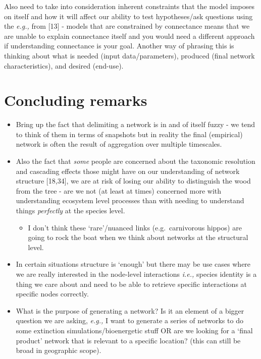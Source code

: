 \documentclass[
]{article}
\providecommand{\tightlist}{%
  \setlength{\itemsep}{0pt}\setlength{\parskip}{0pt}}\usepackage{longtable,booktabs,array}
\begin{document}
\begin{tcolorbox}
Also need to take into consideration inherent constraints that the model
imposes on itself and how it will affect our ability to test
hypotheses/ask questions using the \emph{e.g.,} from {[}13{]} - models
that are constrained by connectance means that we are unable to explain
connectance itself and you would need a different approach if
understanding connectance is your goal. Another way of phrasing this is
thinking about what is needed (input data/parameters), produced (final
network characteristics), and desired (end-use).

\end{tcolorbox}

\section{Concluding remarks}\label{concluding-remarks}

\begin{itemize}
\item
  Bring up the fact that delimiting a network is in and of itself fuzzy
  - we tend to think of them in terms of snapshots but in reality the
  final (empirical) network is often the result of aggregation over
  multiple timescales.
\item
  Also the fact that \emph{some} people are concerned about the
  taxonomic resolution and cascading effects those might have on our
  understanding of network structure {[}18,34{]}, we are at risk of
  losing our ability to distinguish the wood from the tree - are we not
  (at least at times) concerned more with understanding ecosystem level
  processes than with needing to understand things \emph{perfectly} at
  the species level.

  \begin{itemize}
  \tightlist
  \item
    I don't think these `rare'/nuanced links (e.g.~carnivorous hippos)
    are going to rock the boat when we think about networks at the
    structural level.
  \end{itemize}
\item
  In certain situations structure is `enough' but there may be use cases
  where we are really interested in the node-level interactions
  \emph{i.e.,} species identity is a thing we care about and need to be
  able to retrieve specific interactions at specific nodes correctly.
\item
  What is the purpose of generating a network? Is it an element of a
  bigger question we are asking, \emph{e.g.,} I want to generate a
  series of networks to do some extinction simulations/bioenergetic
  stuff OR are we looking for a `final product' network that is relevant
  to a specific location? (this can still be broad in geographic scope).
\end{itemize}
\end{document}
